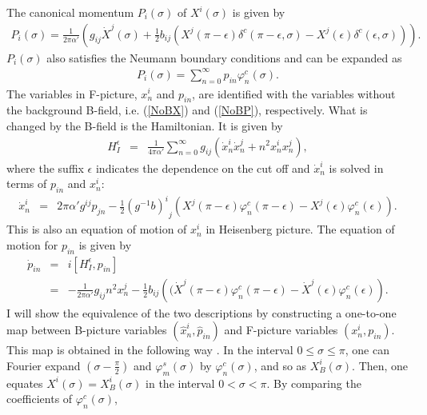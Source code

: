 \documentclass[a4paper,12pt]{article}
\newcommand{\nn}{\nonumber\\}
\newcommand{\co}{\varphi^c}
\newcommand{\si}{\varphi^s}
\newcommand{\e}{\epsilon}
\newcommand{\XB}{X_B}
\begin{document}
The canonical momentum $P_i(\sigma)$
of $X^i(\sigma)$ is given by
\begin{eqnarray}
 \label{FP}
P_i(\sigma) 
= \frac{1}{2\pi\alpha'} 
\left(
g_{ij} \dot{X}^j(\sigma) 
+
\frac{1}{2}
b_{ij} 
  \left(
X^j(\pi-\e) \delta^c(\pi-\e,\sigma) 
-X^j(\e) \delta^c( \e ,\sigma) 
  \right)
\right).
\end{eqnarray}
$P_i(\sigma)$ also satisfies the Neumann boundary conditions
and can be expanded as
\begin{eqnarray}
 \label{Pmode}
P_i(\sigma) =
\sum_{n=0}^{\infty} p_{in} \co_n (\sigma).
\end{eqnarray}
The variables in F-picture,
$x_n^i$ and $p_{i n}$,
are identified with the variables
without the background B-field, i.e.
(\ref{NoBX}) and (\ref{NoBP}),
respectively.
What is changed by the B-field is
the Hamiltonian.
It is given by
\begin{eqnarray}
 \label{modeHI}
H_I^\e
&=&
\frac{1}{4\pi\alpha'}
\sum_{n=0}^\infty
g_{ij} 
\left(
\dot{x}^i_{n} \dot{x}^j_{n} + 
n^2 x^i_n x^j_n
\right),
\end{eqnarray}
where the suffix $\e$ indicates
the dependence on the cut off and
$\dot{x}_n^i$ is solved in terms of 
$p_{i n}$ and $x_n^i$:
\begin{eqnarray}
 \label{eqxn}
\dot{x}^i_n &=& 
2\pi\alpha' g^{ij} p_{jn}
- \frac{1}{2} {(g^{-1}b)^i}_j
\left(
X^j(\pi-\e)\co_n(\pi-\e)-X^j(\e)\co_n(\e)
\right).
\end{eqnarray}
This is also an
equation of motion of 
$x_n^i$
in Heisenberg picture. 
The equation of motion for $p_{i n}$ is given by
\begin{eqnarray}
 \label{eqpn}
\dot{p}_{in} &=& i [H_I^\e , p_{in}] \nn
&=&
-\frac{1}{2\pi\alpha'} 
g_{ij} n^2 x_n^j
-\frac{1}{2}
 b_{ij}
\left(
(\dot{X}^j(\pi-\e)\co_n(\pi-\e)-\dot{X}^j(\e)\co_n(\e)
\right) .
\end{eqnarray}
%
%
%
%
I will show the equivalence of the two 
descriptions by constructing a one-to-one map
between B-picture variables
$(\hat{x}^i_n, \hat{p}_{i n})$
and F-picture variables
$(x^i_n, p_{in})$. 
This map is obtained
in the following way \cite{Ish}.
In the interval
$0 \le \sigma \le \pi$,
one can Fourier expand 
$(\sigma-\frac{\pi}{2})$ and $\si_m(\sigma)$ 
by $\co_n (\sigma)$,
and so as $\XB^i(\sigma)$.
Then, one
equates $X^i(\sigma) = \XB^i(\sigma)$
in the interval $0 < \sigma < \pi$.
By comparing the coefficients of $\co_n (\sigma)$,
\end{document}
